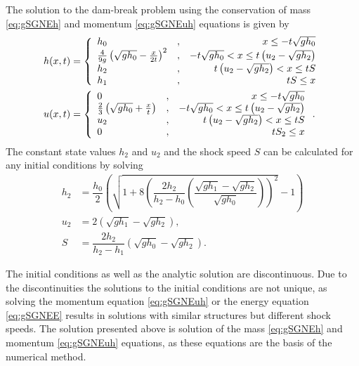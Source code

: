 \documentclass[10pt]{elsarticle}
\begin{document}
The solution to the dam-break problem using the conservation of mass \eqref{eq:gSGNEh} and momentum \eqref{eq:gSGNEuh} equations is given by
\begin{subequations}
\begin{align}
h(x,t) &= \left \lbrace \begin{array}{l c r}
h_0 &,& x \le -t\sqrt{g h_0} \\
\frac{4}{9g} \left(\sqrt{gh_0} - \frac{x}{2t}\right)^2 &,&  -t\sqrt{g h_0} < x \le t \left(u_2 - \sqrt{g h_2}\right)  \\
h_2 &,&  t \left(u_2 - \sqrt{g h_2}\right) < x \le t S  \\
h_1 &,&   t S \le x \\
\end{array} \right.  \\
u(x,t) &= \left \lbrace \begin{array}{l c r}
0 &,& x \le -t\sqrt{g h_0} \\
\frac{2}{3} \left(\sqrt{gh_0} + \frac{x}{t}\right) &,&  -t\sqrt{g h_0} < x \le t \left(u_2 - \sqrt{g h_2}\right)  \\
u_2 &,&  t \left(u_2 - \sqrt{g h_2}\right) < x \le t S  \\
0 &,&   t S_2 \le x \\
\end{array} \right. .
\end{align}
\end{subequations}
%
The constant state values $h_2$ and $u_2$ and the shock speed $S$ can be calculated for any initial conditions by solving
\begin{subequations}
\begin{align}
\label{eq:SWWEMiddleState}
h_2 &= \dfrac{h_0}{2} \left(  \sqrt{1 + 8 \left( \dfrac{2 h_2}{h_2 - h_0} \left(\dfrac{\sqrt{gh_1} - \sqrt{gh_2}}{\sqrt{gh_0}}\right)\right)^2 } - 1 \right) \\
u_2 &= 2\left(\sqrt{gh_1} - \sqrt{gh_2} \right),\\
S &= \dfrac{2 h_2}{h_2 - h_1}\left(\sqrt{gh_0} - \sqrt{gh_2} \right). \label{eq:SWWEMiddleState_S2}
\end{align}
\end{subequations}

The initial conditions as well as the analytic solution are discontinuous. Due to the discontinuities the solutions to the initial conditions are not unique, as solving the momentum equation \eqref{eq:gSGNEuh} or the energy equation \eqref{eq:gSGNEE} results in solutions with similar structures but different shock speeds. The solution presented above is solution of the mass \eqref{eq:gSGNEh} and momentum \eqref{eq:gSGNEuh} equations, as these equations are the basis of the numerical method.
\end{document}
